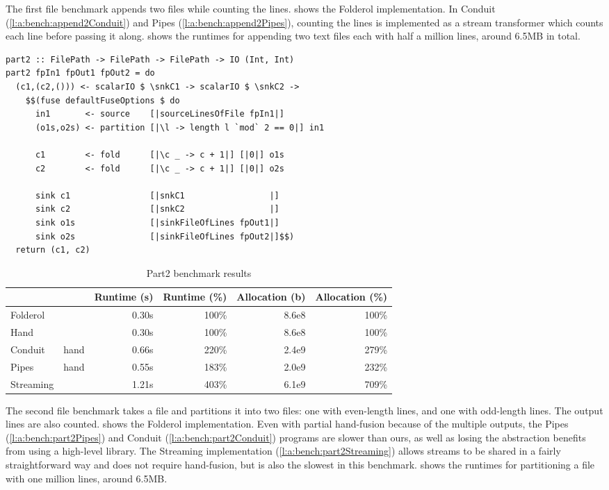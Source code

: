 The first file benchmark appends two files while counting the lines.
 shows the Folderol implementation.
In Conduit (\cref{l:a:bench:append2Conduit}) and Pipes (\cref{l:a:bench:append2Pipes}), counting the lines is implemented as a stream transformer which counts each line before passing it along.
 shows the runtimes for appending two text files each with half a million lines, around 6.5MB in total.



\begin{lstlisting}[float,label=l:bench:part2Folderol,caption=Folderol implementation of part2]
part2 :: FilePath -> FilePath -> FilePath -> IO (Int, Int)
part2 fpIn1 fpOut1 fpOut2 = do
  (c1,(c2,())) <- scalarIO $ \snkC1 -> scalarIO $ \snkC2 ->
    $$(fuse defaultFuseOptions $ do
      in1       <- source    [|sourceLinesOfFile fpIn1|]
      (o1s,o2s) <- partition [|\l -> length l `mod` 2 == 0|] in1

      c1        <- fold      [|\c _ -> c + 1|] [|0|] o1s
      c2        <- fold      [|\c _ -> c + 1|] [|0|] o2s

      sink c1                [|snkC1                 |]
      sink c2                [|snkC2                 |]
      sink o1s               [|sinkFileOfLines fpOut1|]
      sink o2s               [|sinkFileOfLines fpOut2|]$$)
  return (c1, c2)
\end{lstlisting}
\begin{table}
\begin{center}
\begin{tabular}{ll|rrrr}
& & Runtime (s)  & Runtime (\%) & Allocation (b) & Allocation (\%) \\
\hline
Folderol &          & 0.30s &   100\% & 8.6e8 & 100\% \\
Hand     &          & 0.30s &   100\% & 8.6e8 & 100\% \\
Conduit & hand      & 0.66s &   220\% & 2.4e9 & 279\% \\
Pipes  & hand       & 0.55s &   183\% & 2.0e9 & 232\% \\
Streaming &         & 1.21s &   403\% & 6.1e9 & 709\% \\
\end{tabular}
\end{center}
\caption[Part2 benchmark results]{Part2 benchmark results}
\label{table:bench:part2}
\end{table}

The second file benchmark takes a file and partitions it into two files: one with even-length lines, and one with odd-length lines.
The output lines are also counted.
 shows the Folderol implementation.
Even with partial hand-fusion because of the multiple outputs, the Pipes (\cref{l:a:bench:part2Pipes}) and Conduit (\cref{l:a:bench:part2Conduit}) programs are slower than ours, as well as losing the abstraction benefits from using a high-level library.
The Streaming implementation (\cref{l:a:bench:part2Streaming}) allows streams to be shared in a fairly straightforward way and does not require hand-fusion, but is also the slowest in this benchmark.
 shows the runtimes for partitioning a file with one million lines, around 6.5MB.

